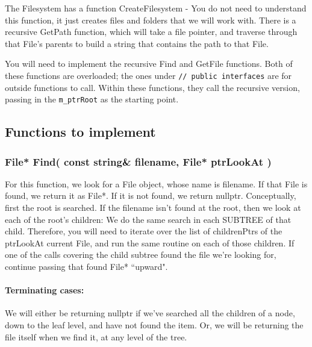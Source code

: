 \documentclass[a4paper,12pt,oneside]{book}
\begin{document}
The Filesystem has a function CreateFilesystem - You do not need to understand
this function, it just creates files and folders that we will work with.
There is a recursive GetPath function, which will take a file pointer,
and traverse through that File's parents to build a string that contains the path to that File.

You will need to implement the recursive Find and GetFile functions.
Both of these functions are overloaded; the ones under
\texttt{// public interfaces} are for outside functions to call.
Within these functions, they call the recursive version, passing in the
\texttt{m\_ptrRoot} as the starting point.




\subsection{Functions to implement}

\subsubsection{ File* Find( const string\& filename, File* ptrLookAt ) }

For this function, we look for a File object, whose name is filename.
If that File is found, we return it as File*. If it is not found, we return nullptr.
Conceptually, first the root is searched. If the filename isn't found at
the root, then we look at each of the root's children: We do the same search in each SUBTREE of that child.
Therefore, you will need to iterate over the list of childrenPtrs of the
ptrLookAt current File, and run the same routine on each of those children.
If one of the calls covering the child subtree found the file we're looking
for, continue passing that found File* ``upward".

\paragraph{Terminating cases:}

We will either be returning nullptr if we've searched all the children of a node, down to the leaf level, and have not found the item. Or, we will be returning the file itself when we find it, at any level of the tree.
\end{document}
